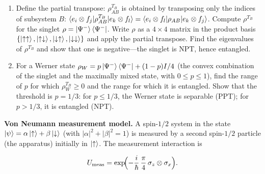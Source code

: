 \begin{problemset}
\begin{enumerate}
\item[(a)] Define the partial transpose: $\rho_{AB}^{T_B}$ is obtained by transposing only the indices of subsystem $B$: $\braket{e_i \otimes f_j|\rho_{AB}^{T_B}|e_k \otimes f_l} = \braket{e_i \otimes f_l|\rho_{AB}|e_k \otimes f_j}$. Compute $\rho^{T_B}$ for the singlet $\rho = \ket{\Psi^-}\bra{\Psi^-}$. Write $\rho$ as a $4\times4$ matrix in the product basis $\{\ket{\uparrow\uparrow}, \ket{\uparrow\downarrow}, \ket{\downarrow\uparrow}, \ket{\downarrow\downarrow}\}$ and apply the partial transpose. Find the eigenvalues of $\rho^{T_B}$ and show that one is negative---the singlet is NPT, hence entangled.
\item[(b)] For a Werner state $\rho_W = p\ket{\Psi^-}\bra{\Psi^-} + (1-p)I/4$ (the convex combination of the singlet and the maximally mixed state, with $0 \le p \le 1$), find the range of $p$ for which $\rho_W^{T_B} \ge 0$ and the range for which it is entangled. Show that the threshold is $p = 1/3$: for $p \le 1/3$, the Werner state is separable (PPT); for $p > 1/3$, it is entangled (NPT).
\end{enumerate}

\item[Exercise 7.9] \textbf{Von Neumann measurement model.}
\label{item:ex-von-neumann}
A spin-$1/2$ system in the state $\ket{\psi} = \alpha\ket{\uparrow} + \beta\ket{\downarrow}$ (with $\lvert\alpha\rvert^2 + \lvert\beta\rvert^2 = 1$) is measured by a second spin-$1/2$ particle (the apparatus) initially in $\ket{\uparrow}$. The measurement interaction is
\begin{linenomath}
\begin{equation}
U_{\text{meas}} = \exp\!\Bigl(-\frac{i}{\hbar}\,\frac{\pi}{4}\,\sigma_z \otimes \sigma_x\Bigr).
\end{equation}
\end{linenomath}


\end{problemset}
